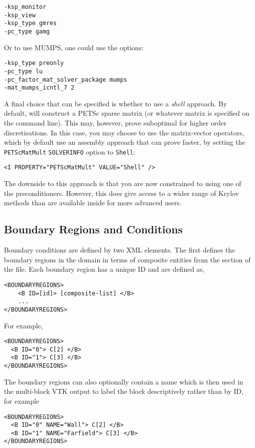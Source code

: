 \begin{lstlisting}[style=BashInputStyle]
-ksp_monitor
-ksp_view
-ksp_type gmres
-pc_type gamg
\end{lstlisting}

Or to use MUMPS, one could use the options:

\begin{lstlisting}[style=BashInputStyle]
-ksp_type preonly
-pc_type lu
-pc_factor_mat_solver_package mumps
-mat_mumps_icntl_7 2
\end{lstlisting}

A final choice that can be specified is whether to use a \emph{shell}
approach. By default, \nekpp will construct a PETSc sparse matrix (or whatever
matrix is specified on the command line). This may, however, prove suboptimal
for higher order discretisations. In this case, you may choose to use the \nekpp
matrix-vector operators, which by default use an assembly approach that can
prove faster, by setting the \texttt{PETScMatMult} \texttt{SOLVERINFO} option to
\texttt{Shell}:

\begin{lstlisting}[style=XMLStyle]
<I PROPERTY="PETScMatMult" VALUE="Shell" />
\end{lstlisting}

The downside to this approach is that you are now constrained to using one of
the \nekpp preconditioners. However, this does give access to a wider range of
Krylov methods than are available inside \nekpp for more advanced users.

\subsection{Boundary Regions and Conditions}

Boundary conditions are defined by two XML elements. The first defines the
boundary regions in the domain in terms of composite entities from the
 section of the file. Each boundary region has a unique ID and
are defined as, 
\begin{lstlisting}[style=XMLStyle]
<BOUNDARYREGIONS>
    <B ID=[id]> [composite-list] </B>
    ...
</BOUNDARYREGIONS>
\end{lstlisting}
For example,
\begin{lstlisting}[style=XMLStyle]
<BOUNDARYREGIONS>
  <B ID="0"> C[2] </B>
  <B ID="1"> C[3] </B>
</BOUNDARYREGIONS>
\end{lstlisting}

The boundary regions can also optionally contain a name which is then used in the
multi-block VTK output to label the block descriptively rather than by ID, for
example
\begin{lstlisting}[style=XMLStyle]
<BOUNDARYREGIONS>
  <B ID="0" NAME="Wall"> C[2] </B>
  <B ID="1" NAME="Farfield"> C[3] </B>
</BOUNDARYREGIONS>
\end{lstlisting}

